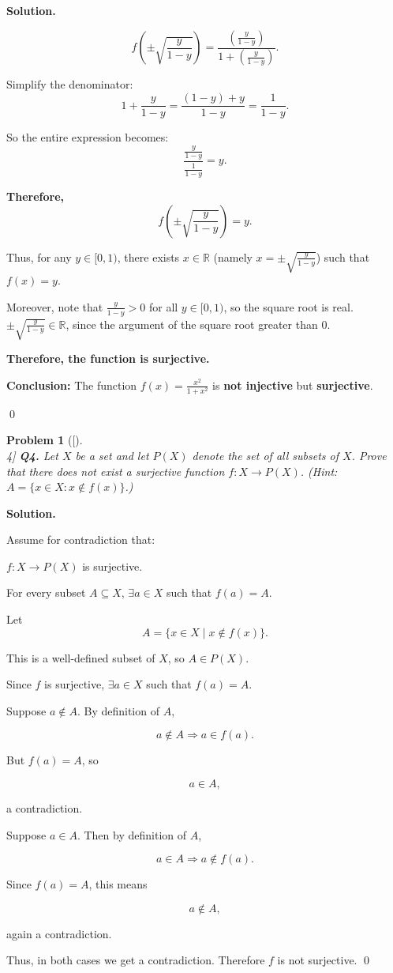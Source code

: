\documentclass[12pt]{article}
\newtheorem{problemx}{Problem}
\newenvironment{problem}[1]{%
	\begin{problemx}[#1]\leavevmode\\[0.5em] %
	}{%
	\end{problemx}
}
\newenvironment{solution}{%
	\par\medskip
	\noindent\textbf{Solution.}\par\nopagebreak
}{%
	\hfill \qed \par\medskip
}
\begin{document}
\begin{solution}
 \[
 f\left(\pm\sqrt{\frac{y}{1 - y}}\right)
 = \frac{\left(\frac{y}{1 - y}\right)}{1 + \left(\frac{y}{1 - y}\right)}.
 \]
 
 Simplify the denominator:
 \[
 1 + \frac{y}{1 - y} = \frac{(1 - y) + y}{1 - y} = \frac{1}{1 - y}.
 \]
 
 So the entire expression becomes:
 \[
 \frac{\frac{y}{1 - y}}{\frac{1}{1 - y}} = y.
 \]
 
 \noindent\textbf{Therefore,}
 \[
 f\left(\pm\sqrt{\frac{y}{1 - y}}\right) = y.
 \]
 
Thus, for any $y \in [0, 1)$, there exists $x \in \mathbb{R}$ (namely $x = \pm\sqrt{\frac{y}{1-y}}$) such that $f(x) = y$.

Moreover, note that $\frac{y}{1-y} > 0$ for all $y \in [0, 1)$, so the square root is real. $\pm\sqrt{\frac{y}{1-y}} \in \mathbb{R}$, since the argument of the square root greater than $0$.

\textbf{Therefore, the function is surjective.}

\medskip

\noindent\textbf{Conclusion:} The function \( f(x) = \frac{x^2}{1 + x^2} \) is \textbf{not injective} but \textbf{surjective}.

		
		
	\end{solution}
	
	\begin{problem}[4]
		\textbf{Q4.} Let $X$ be a set and let $P(X)$ denote the set of all subsets of $X$. Prove that there does not exist a surjective function $f: X \to P(X)$. (Hint: $A = \{ x \in X : x \notin f(x) \}$.)
	\end{problem}
	
	\begin{solution}
		Assume for contradiction that:
		
		$f: X \to P(X)$ is surjective.
		
		For every subset $A \subseteq X$, $\exists a \in X$ such that $f(a) = A$.
		
		Let 
		$$A = \{ x \in X \mid x \notin f(x) \}.$$
		
		This is a well-defined subset of $X$, so $A \in P(X)$.
		
		Since $f$ is surjective, $\exists a \in X$ such that $f(a) = A$.
		
		Suppose $a \notin A$. By definition of $A$,
		
		$$a \notin A \Rightarrow a \in f(a).$$
		
		But $f(a) = A$, so 
		
		$$a \in A,$$
		
		a contradiction.
		
		Suppose $a \in A$. Then by definition of $A$,
		
		$$a \in A \Rightarrow a \notin f(a).$$
		
		Since $f(a) = A$, this means 
		
		$$a \notin A,$$
		
		again a contradiction.
		
		Thus, in both cases we get a contradiction. Therefore $f$ is not surjective.
	\end{solution}
	
\end{document}
